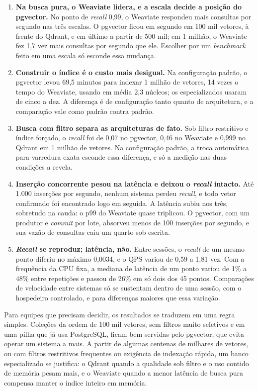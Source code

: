 \begin{enumerate}
    \item \textbf{Na busca pura, o Weaviate lidera, e a escala decide a posição do pgvector.} No ponto de \textit{recall} 0,99, o Weaviate respondeu mais consultas por segundo nas três escalas. O pgvector ficou em segundo em 100 mil vetores, à frente do Qdrant, e em último a partir de 500 mil; em 1 milhão, o Weaviate fez 1,7 vez mais consultas por segundo que ele. Escolher por um \textit{benchmark} feito em uma escala só esconde essa mudança.
    \item \textbf{Construir o índice é o custo mais desigual.} Na configuração padrão, o pgvector levou 69,5 minutos para indexar 1 milhão de vetores, 14 vezes o tempo do Weaviate, usando em média 2,3 núcleos; os especializados usaram de cinco a dez. A diferença é de configuração tanto quanto de arquitetura, e a comparação vale como padrão contra padrão.
    \item \textbf{Busca com filtro separa as arquiteturas de fato.} Sob filtro restritivo e índice forçado, o \textit{recall} foi de 0,07 no pgvector, 0,46 no Weaviate e 0,999 no Qdrant em 1 milhão de vetores. Na configuração padrão, a troca automática para varredura exata esconde essa diferença, e só a medição nas duas condições a revela.
    \item \textbf{Inserção concorrente pesou na latência e deixou o \textit{recall} intacto.} Até 1.000 inserções por segundo, nenhum sistema perdeu \textit{recall}, e todo vetor confirmado foi encontrado logo em seguida. A latência subiu nos três, sobretudo na cauda: o p99 do Weaviate quase triplicou. O pgvector, com um produtor e \textit{commit} por lote, absorveu menos de 100 inserções por segundo, e sua vazão de consultas caiu um quarto sob escrita.
    \item \textbf{\textit{Recall} se reproduz; latência, não.} Entre sessões, o \textit{recall} de um mesmo ponto diferiu no máximo 0,0034, e o QPS variou de 0,59 a 1,81 vez. Com a frequência da CPU fixa, a mediana de latência de um ponto variou de 1\% a 48\% entre repetições e passou de 26\% em só dois dos 45 pontos. Comparações de velocidade entre sistemas só se sustentam dentro de uma sessão, com o hospedeiro controlado, e para diferenças maiores que essa variação.
\end{enumerate}

Para equipes que precisam decidir, os resultados se traduzem em uma regra simples. Coleções da ordem de 100 mil vetores, sem filtros muito seletivos e em uma pilha que já usa PostgreSQL, ficam bem servidas pelo pgvector, que evita operar um sistema a mais. A partir de algumas centenas de milhares de vetores, ou com filtros restritivos frequentes ou exigência de indexação rápida, um banco especializado se justifica: o Qdrant quando a qualidade sob filtro e o uso contido de memória pesam mais, e o Weaviate quando a menor latência de busca pura compensa manter o índice inteiro em memória.

